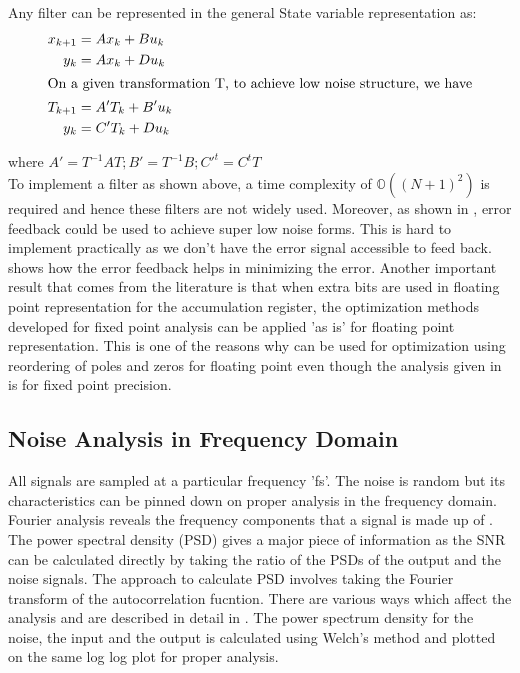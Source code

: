 \documentclass[a4paper,12pt]{article}
\begin{document}
Any filter can be represented in the general State variable representation as:
\begin{align}
x_{k+1} &= Ax_{k} + Bu_{k} \\
y_{k} &= Ax_{k} + Du_{k} \\
\intertext {On a given transformation T, to achieve low noise structure, we have}
T_{k+1} &= A'T_{k} + B'u_{k}\\
y_{k} &= C'T_{k} + Du_{k}
\end{align}

where $A'=T^{-1}AT; B'=T^{-1}B; C'^{t}=C^{t}T$
\\To implement a filter as shown above, a time complexity of $\mathbb{O}((N+1)^{2})$ is required and hence these filters are not widely used. Moreover, as shown in \cite{Chang}, error feedback could be used to achieve super low noise forms. This is hard to implement practically as we don't have the error signal accessible to feed back. \cite{Mullis} shows how the error feedback helps in minimizing the error.
Another important result that comes from the literature is that when extra bits are used in floating point representation for the accumulation register, the optimization methods developed for fixed point analysis can be applied 'as is' for floating point representation\cite{Bomar}. This is one of the reasons why \cite{Dehner} can be used for  optimization using reordering of poles and zeros for floating point even though the analysis given in \cite{Dehner} is for fixed point precision.
	\subsection{Noise Analysis in Frequency Domain}
All signals are sampled at a particular frequency 'fs'. The noise is random but its characteristics can be pinned down on proper analysis in the frequency domain. Fourier analysis reveals the frequency components that a signal is made up of \cite{Oppenheim}. The power spectral density (PSD) \cite{Cerna} gives a major piece of information as the SNR can be calculated directly by taking the ratio of the PSDs of the output and the noise signals. The approach to calculate PSD involves taking the Fourier transform of the autocorrelation fucntion. There are various ways which affect the analysis and are described in detail in \cite{Kanner}. The power spectrum density for the noise, the input and the output is calculated using Welch's method \cite{Welch} and plotted on the same log log plot for proper analysis. 
\end{document}
